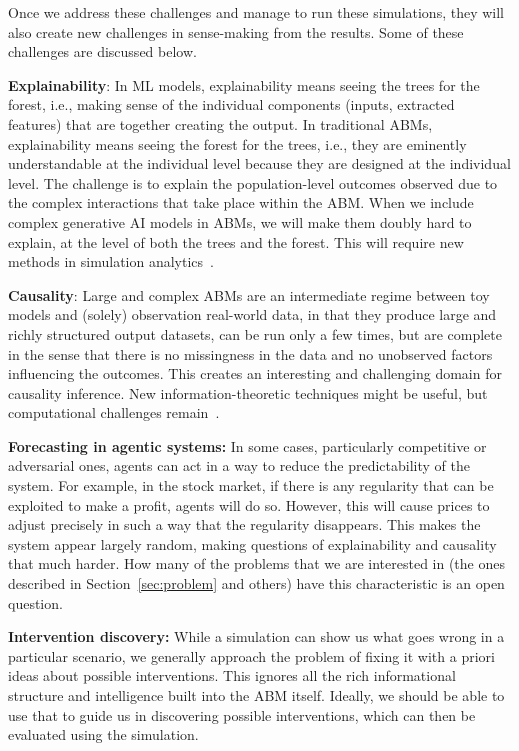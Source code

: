Once we address these challenges and manage to run these simulations, they will also create new challenges in sense-making from the
results. Some of these challenges are discussed below.

\smallskip
\noindent
\textbf{Explainability}: In ML models, explainability means seeing the trees for the forest, i.e., making sense of the individual components 
(inputs, extracted features) that are together creating the output. In traditional ABMs, explainability means seeing the forest for the trees, 
i.e., they are eminently understandable at the individual level because they are designed at the individual level. The challenge is to explain 
the population-level outcomes observed due to the complex interactions that take place within the ABM. When we include complex
generative AI models in ABMs, we will make them doubly hard to explain, at the level of both the trees and the forest. This will require new 
methods in simulation analytics~\citep{swarup19analytics}.

\smallskip
\noindent
\textbf{Causality}: Large and complex ABMs are an intermediate regime between toy models and (solely)
observation real-world data, in that they produce large and richly structured output datasets, can be run
only a few times, but are complete in the sense that there is no missingness in the data and no unobserved
factors influencing the outcomes. This creates an interesting and challenging domain for causality inference.
New information-theoretic techniques might be useful, but computational challenges remain~\citep{MartinezSanchez2024synergy}.

\smallskip
\noindent
\textbf{Forecasting in agentic systems:} In some cases, particularly competitive or adversarial ones, agents can act in a way to reduce
the predictability of the system. For example, in the stock market, if there is any regularity that can be exploited to make a profit, agents
will do so. However, this will cause prices to adjust precisely in such a way that the regularity disappears. This makes the system appear
largely random, making questions of explainability and causality that much harder. How many of the problems that we are interested in (the ones
described in Section~\ref{sec:problem} and others) have this characteristic is an open question.

\smallskip
\noindent
\textbf{Intervention discovery:} While a simulation can show us what goes wrong in a particular scenario, we generally approach the 
problem of fixing it with a priori ideas about possible interventions. This ignores all the rich informational structure and intelligence
built into the ABM itself. Ideally, we should be able to use that to guide us in discovering possible interventions, which can then be
evaluated using the simulation.





